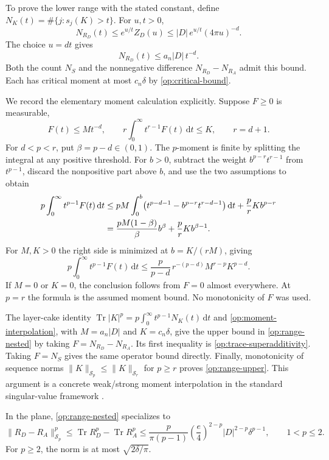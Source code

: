 \documentclass[11pt,reqno]{amsart}
\numberwithin{equation}{section}
\newcommand{\dd}{\,\mathrm d}
\newcommand{\abs}[1]{\lvert#1\rvert}
\newcommand{\norm}[1]{\lVert#1\rVert}
\DeclareMathOperator{\Tr}{Tr}
\begin{document}
To prove the lower range with the stated constant, define
$N_K(t)=\#\{j:s_j(K)>t\}$.  For $u,t>0$,
\[
 N_{R_D}(t)\le e^{u/t}Z_D(u)
            \le\abs D\,e^{u/t}(4\pi u)^{-d}.
\]
The choice $u=dt$ gives
\begin{equation}\label{op:weak-count}
 N_{R_D}(t)\le a_n\abs D\,t^{-d}.
\end{equation}
Both the count $N_S$ and the nonnegative difference
$N_{R_D}-N_{R_A}$ admit this bound.  Each has critical moment
at most $c_n\delta$ by \eqref{op:critical-bound}.

We record the elementary moment calculation explicitly.  Suppose
$F\ge0$ is measurable,
\[
 F(t)\le Mt^{-d},\qquad
 r\int_0^\infty t^{r-1}F(t)\dd t\le K,
 \qquad r=d+1.
\]
For $d<p<r$, put $\beta=p-d\in(0,1)$.  The $p$-moment is finite
by splitting the integral at any positive threshold.  For $b>0$,
subtract the weight $b^{p-r}t^{r-1}$ from $t^{p-1}$, discard the
nonpositive part above $b$, and use the two assumptions to obtain
\begin{align}
 p\int_0^\infty t^{p-1}F(t)\dd t
 &\le pM\int_0^b
       \bigl(t^{p-d-1}-b^{p-r}t^{r-d-1}\bigr)\dd t
       +\frac prKb^{p-r}\notag\\
 &=\frac{pM(1-\beta)}\beta b^\beta
       +\frac prKb^{\beta-1}.
 \label{op:moment-threshold}
\end{align}
For $M,K>0$ the right side is minimized at $b=K/(rM)$, giving
\begin{equation}\label{op:moment-interpolation}
 p\int_0^\infty t^{p-1}F(t)\dd t
 \le\frac p{p-d}\,r^{-(p-d)}M^{r-p}K^{p-d}.
\end{equation}
If $M=0$ or $K=0$, the conclusion follows from $F=0$ almost
everywhere.  At $p=r$ the formula is the assumed moment bound.
No monotonicity of $F$ was used.

The layer-cake identity
$\Tr\abs K^p=p\int_0^\infty t^{p-1}N_K(t)\dd t$
and \eqref{op:moment-interpolation}, with
$M=a_n\abs D$ and $K=c_n\delta$, give the upper bound in
\eqref{op:range-nested} by taking
$F=N_{R_D}-N_{R_A}$.  Its first inequality is
\eqref{op:trace-superadditivity}.  Taking $F=N_S$ gives the same
operator bound directly.  Finally, monotonicity of sequence norms
$\norm K_{\mathcal S_p}\le\norm K_{\mathcal S_r}$ for $p\ge r$
proves \eqref{op:range-upper}.  This argument is a concrete
weak/strong moment interpolation in the standard singular-value
framework \cite{FackKosaki1986}.

In the plane, \eqref{op:range-nested} specializes to
\begin{equation}\label{op:planar-range}
 \norm{R_D-R_A}_{\mathcal S_p}^{p}
 \le\Tr R_D^p-\Tr R_A^p
 \le\frac{p}{\pi(p-1)}\left(\frac e4\right)^{2-p}
       \abs D^{2-p}\delta^{p-1},\qquad1<p\le2.
\end{equation}
For $p\ge2$, the norm is at most $\sqrt{2\delta/\pi}$.
\end{document}
